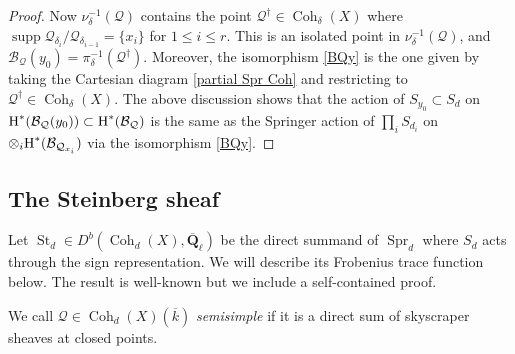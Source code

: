 \documentclass[reqno]{amsart}
\numberwithin{equation}{section}
\newcommand{\Q}{\mathbf{Q}}
\DeclareMathOperator{\Coh}{Coh}
\DeclareMathOperator{\supp}{supp}
\DeclareMathOperator{\St}{St}
\DeclareMathOperator{\Spr}{Spr}
\newcommand{\Qlbar}{\overline{\Q}_\ell}
\newcommand{\ov}{\overline}
\newcommand\ot{\otimes}
\newcommand{\cohog}[2]{\textup{H}^{#1}({#2})}     %
\renewcommand\d\delta
\newcommand\da{\dagger}
\newcommand\cB{\mathcal{B}}
\newcommand\cQ{\mathcal{Q}}
\theoremstyle{remark}
\numberwithin{equation}{section}
\begin{document}
\begin{proof}
Now $\nu_{\d}^{-1}(\cQ)$ contains the point $\cQ^{\da}\in \Coh_{\d}(X)$ where $\supp\cQ_{\d_{i}}/\cQ_{\d_{i-1}}=\{x_{i}\}$ for $1\le i\le r$. This is an isolated point in $\nu^{-1}_{\d}(\cQ)$, and $\cB_{\cQ}(y_{0})=\pi_{\d}^{-1}(\cQ^{\da})$.   Moreover, the isomorphism \eqref{BQy} is the one given by taking the Cartesian diagram \eqref{partial Spr Coh} and restricting to $\cQ^{\da}\in \Coh_{\d}(X)$. The above discussion shows that the action of $S_{y_{0}}\subset S_{d}$ on $\cohog{*}{\cB_{\cQ}(y_{0})}\subset \cohog{*}{\cB_{\cQ}}$ is the same as the Springer action of $\prod_{i}S_{d_{i}}$ on $\ot_{i}\cohog{*}{\cB_{\cQ_{x_{i}}}}$ via the isomorphism \eqref{BQy}.
\end{proof}



\subsection{The Steinberg sheaf} Let $\St_{d}\in D^{b}(\Coh_{d}(X),\Qlbar)$ be the direct summand of $\Spr_{d}$ where $S_{d}$ acts through the sign representation. We will describe its Frobenius trace function below.   The result is well-known but we include a self-contained proof.

We call $\cQ\in \Coh_{d}(X)(\ov k)$ {\em semisimple} if it is a direct sum of skyscraper sheaves at closed points.
\end{document}
